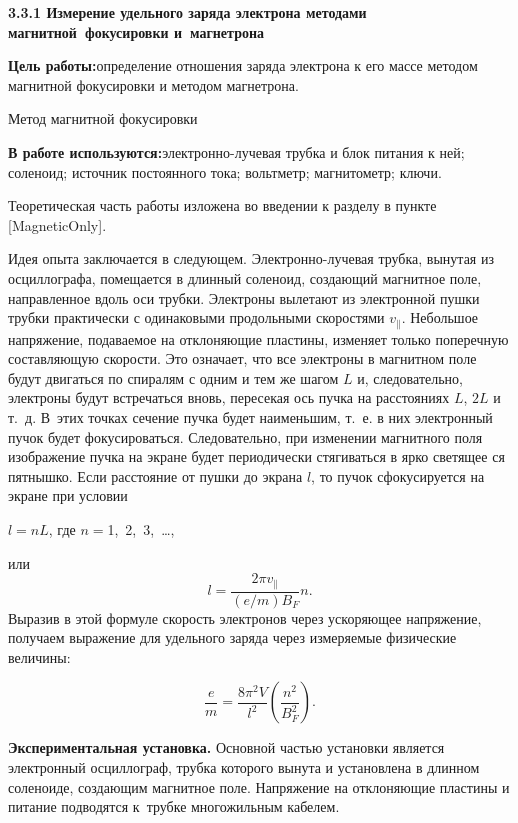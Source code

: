 

{\large \bf 3.3.1 Измерение удельного заряда электрона методами магнитной~фокусировки и~магнетрона}

{\bf Цель работы:}определение отношения заряда электрона к его массе методом магнитной фокусировки и методом магнетрона.



{\LARGE  Метод магнитной фокусировки}

{\bf В работе используются:}{электронно-лучевая трубка и блок питания к ней; соленоид; источник постоянного тока; вольтметр;  магнитометр; ключи.}

Теоретическая часть работы изложена во введении к разделу в пункте [MagneticOnly].

Идея опыта заключается в следующем. Электронно-лучевая трубка, вынутая из осциллографа, помещается в длинный соленоид, создающий магнитное поле, направленное вдоль оси трубки. Электроны вылетают из электронной пушки трубки практически с одинаковыми продольными скоростями $v_{\parallel}$. Небольшое напряжение, подаваемое на отклоняющие пластины, изменяет только поперечную составляющую скорости. Это означает, что все электроны в магнитном поле будут двигаться по спиралям с одним и тем же шагом $L$ и, следовательно, электроны будут встречаться вновь, пересекая ось пучка на расстояниях $L$, $2L$ и т.~д. В~этих точках сечение пучка будет наименьшим, т.~е. в них электронный пучок будет фокусироваться. Следовательно, при изменении магнитного поля изображение пучка на экране будет периодически стягиваться в ярко светящее ся пятнышко. Если расстояние от пушки до экрана $l$, то пучок сфокусируется на экране при условии

$l=nL$, где $n=$1,\, 2,\, 3,\, \ldots,

или
$$
l=\frac{2\pi v_{\parallel}}{(e/m)B_F}n.
$$
Выразив в этой формуле скорость электронов через ускоряющее напряжение, получаем выражение для удельного заряда через измеряемые физические величины:

\begin{equation}
\frac{e}{m}=\frac{8\pi^2V}{l^2}\left(\frac{n^2}{B_F^2}\right).
\label{eq3.1.11}
\end{equation}

{\bf Экспериментальная установка.} Основной частью установки является электронный осциллограф, трубка которого вынута и установлена в длинном соленоиде, создающим магнитное поле. Напряжение на отклоняющие пластины и питание подводятся к~трубке многожильным кабелем.

